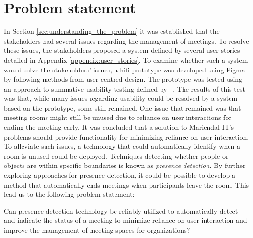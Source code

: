 \section{Problem statement}\label{sec:problem_statement}
In Section \ref{sec:understanding_the_problem} it was established that the stakeholders had several issues regarding the management of meetings. 
To resolve these issues, the stakeholders proposed a system defined by several user stories detailed in Appendix \ref{appendix:user_stories}. 
To examine whether such a system would solve the stakeholders' issues, a hifi prototype was developed using Figma\cite{Figma} by following methods from user-centred design.
The prototype was tested using an approach to summative usability testing defined by \citeauthor{lazar2005web}~\cite{lazar2005web}. 
The results of this test was that, while many issues regarding usability could be resolved by a system based on the prototype, some still remained. 
One issue that remained was that meeting rooms might still be unused due to reliance on user interactions for ending the meeting early.
It was concluded that a solution to Mariendal IT's problems should provide functionality for minimizing reliance on user interaction.
To alleviate such issues, a technology that could automatically identify when a room is unused could be deployed. 
Techniques detecting whether people or objects are within specific boundaries is known as \textit{presence detection}.
By further exploring approaches for presence detection, it could be possible to develop a method that automatically ends meetings when participants leave the room.
This lead us to the following problem statement:
\begin{problem_statement}
    Can presence detection technology be reliably utilized to automatically detect and indicate the status of a meeting to minimize reliance on user interaction and improve the management of meeting spaces for organizations? 
\end{problem_statement}

